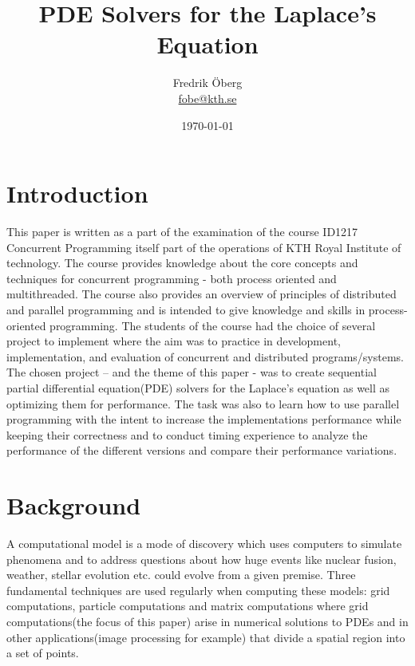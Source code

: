 \documentclass{article}
\begin{document}
\title{PDE Solvers for the Laplace's Equation}
\author{Fredrik Öberg \\ \href{mailto:fobe@kth.se}{fobe@kth.se}}
\date{\today}
\maketitle


\newpage
\tableofcontents
\newpage

\section{Introduction}
This paper is written as a part of the examination of the course ID1217 Concurrent Programming 
itself part of the operations of KTH Royal Institute of technology. The course provides knowledge about the core concepts and techniques for concurrent programming - both process oriented and multithreaded. The course also provides an overview of principles of distributed and parallel programming and is intended to give knowledge and skills in process-oriented programming. 
The students of the course had the choice of several project to implement where the aim was to practice in development, implementation, and evaluation of concurrent and distributed programs/systems. The chosen project – and the theme of this paper - was to create sequential partial differential equation(PDE) solvers for the Laplace’s equation as well as optimizing them for performance. The task was also to learn how to use parallel programming with the intent to increase the implementations performance while keeping their correctness and to conduct timing experience to analyze the performance of the different versions and compare their performance variations.

\section{Background}\label{programs}

A computational model is a mode of discovery which uses computers to simulate phenomena and to address questions about how huge events like nuclear fusion, weather, stellar evolution etc. could evolve from a given premise. Three fundamental techniques are used regularly when computing these models: grid computations, particle computations and matrix computations where grid computations(the focus of this paper) arise in numerical solutions to PDEs and in other applications(image processing for example) that divide a spatial region into a set of points. 
\end{document}
